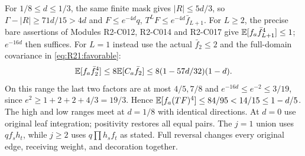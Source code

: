 For $1/8\le d\le1/3$, the same finite mask gives
$|R|\le5d/3$, so $\Gamma-|R|\ge71d/15>4d$ and
$F\le e^{-4d}q$, $T^LF\le e^{-4d}\bar f_{L+1}$.
For $L\ge2$, the precise bare assertions of Modules R2-C012,
R2-C014 and R2-C017 give $\mathbb E[f_a\bar f_{L+1}^4]\le1$;
$e^{-16d}$ then suffices. For $L=1$ instead use the actual
$\bar f_2\le2$ and the full-domain covariance in
\eqref{eq:R21:favorable}:
\[
\mathbb E[f_a\bar f_2^4]\le8\mathbb E[C_a\bar f_2]
\le8(1-57d/32)(1-d).
\]
On this range the last two factors are at most $4/5,7/8$ and
$e^{-16d}\le e^{-2}\le3/19$, since
$e^2\ge1+2+2+4/3=19/3$. Hence
$\mathbb E[f_a(TF)^4]\le84/95<14/15\le1-d/5$.
The high and low ranges meet at $d=1/8$ with identical directions.
At $d=0$ use original leaf integration; positivity restores all equal
pairs. The $j=1$ union uses $qf_sh_t$, while $j\ge2$ uses
$q\prod h_sf_t$ as stated. Full reversal changes every original
edge, receiving weight, and decoration together.
